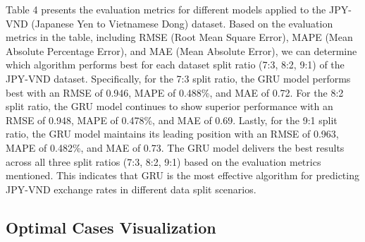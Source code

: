 \documentclass{ieeeojies}
\begin{document}
Table 4 presents the evaluation metrics for different models applied to the JPY-VND (Japanese Yen to Vietnamese Dong) dataset. Based on the evaluation metrics in the table, including RMSE (Root Mean Square Error), MAPE (Mean Absolute Percentage Error), and MAE (Mean Absolute Error), we can determine which algorithm performs best for each dataset split ratio (7:3, 8:2, 9:1) of the JPY-VND dataset. Specifically, for the 7:3 split ratio, the GRU model performs best with an RMSE of 0.946, MAPE of 0.488\%, and MAE of 0.72. For the 8:2 split ratio, the GRU model continues to show superior performance with an RMSE of 0.948, MAPE of 0.478\%, and MAE of 0.69. Lastly, for the 9:1 split ratio, the GRU model maintains its leading position with an RMSE of 0.963, MAPE of 0.482\%, and MAE of 0.73. The GRU model delivers the best results across all three split ratios (7:3, 8:2, 9:1) based on the evaluation metrics mentioned. This indicates that GRU is the most effective algorithm for predicting JPY-VND exchange rates in different data split scenarios.

\subsection{Optimal Cases Visualization} 
\end{document}
